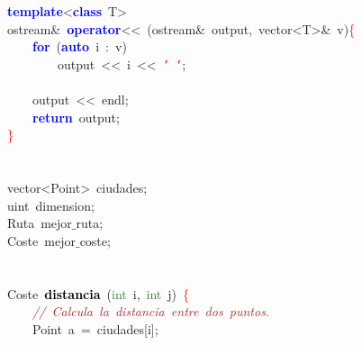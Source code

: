 \mbox{}\textbf{\textcolor{Blue}{template}}\textcolor{BrickRed}{\textless{}}\textbf{\textcolor{Blue}{class}}\ \textcolor{TealBlue}{T}\textcolor{BrickRed}{\textgreater{}} \\
\mbox{}ostream\textcolor{BrickRed}{\&}\ \textbf{\textcolor{Blue}{operator}}\textcolor{BrickRed}{\textless{}\textless{}}\ \textcolor{BrickRed}{(}ostream\textcolor{BrickRed}{\&}\ output\textcolor{BrickRed}{,}\ vector\textcolor{BrickRed}{\textless{}}T\textcolor{BrickRed}{\textgreater{}\&}\ v\textcolor{BrickRed}{)}\textcolor{Red}{\{} \\
\mbox{}\ \ \ \ \textbf{\textcolor{Blue}{for}}\ \textcolor{BrickRed}{(}\textbf{\textcolor{Blue}{auto}}\ i\ \textcolor{BrickRed}{:}\ v\textcolor{BrickRed}{)} \\
\mbox{}\ \ \ \ \ \ \ \ output\ \textcolor{BrickRed}{\textless{}\textless{}}\ i\ \textcolor{BrickRed}{\textless{}\textless{}}\ \texttt{\textcolor{Red}{'\ '}}\textcolor{BrickRed}{;} \\
\mbox{}\ \ \ \  \\
\mbox{}\ \ \ \ output\ \textcolor{BrickRed}{\textless{}\textless{}}\ endl\textcolor{BrickRed}{;} \\
\mbox{}\ \ \ \ \textbf{\textcolor{Blue}{return}}\ output\textcolor{BrickRed}{;} \\
\mbox{}\textcolor{Red}{\}} \\
\mbox{} \\
\mbox{} \\
\mbox{}\textcolor{TealBlue}{vector\textless{}Point\textgreater{}}\ ciudades\textcolor{BrickRed}{;} \\
\mbox{}\textcolor{TealBlue}{uint}\ dimension\textcolor{BrickRed}{;} \\
\mbox{}\textcolor{TealBlue}{Ruta}\ mejor$\_$ruta\textcolor{BrickRed}{;} \\
\mbox{}\textcolor{TealBlue}{Coste}\ mejor$\_$coste\textcolor{BrickRed}{;} \\
\mbox{} \\
\mbox{} \\
\mbox{}\textcolor{TealBlue}{Coste}\ \textbf{\textcolor{Black}{distancia}}\ \textcolor{BrickRed}{(}\textcolor{ForestGreen}{int}\ i\textcolor{BrickRed}{,}\ \textcolor{ForestGreen}{int}\ j\textcolor{BrickRed}{)}\ \textcolor{Red}{\{} \\
\mbox{}\ \ \ \ \textit{\textcolor{Brown}{//\ Calcula\ la\ distancia\ entre\ dos\ puntos.}} \\
\mbox{}\ \ \ \ \textcolor{TealBlue}{Point}\ a\ \textcolor{BrickRed}{=}\ ciudades\textcolor{BrickRed}{[}i\textcolor{BrickRed}{];} \\
